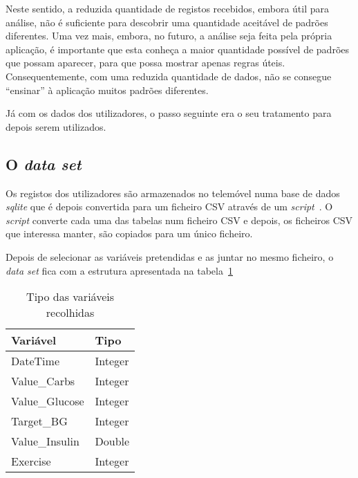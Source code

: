 Neste sentido, a reduzida quantidade de registos recebidos, embora útil para análise, não é suficiente para descobrir uma quantidade aceitável de padrões diferentes. Uma vez mais, embora, no futuro, a análise seja feita pela própria aplicação, é importante que esta conheça a maior quantidade possível de padrões que possam aparecer, para que possa mostrar apenas regras úteis. Consequentemente, com uma reduzida quantidade de dados, não se consegue ``ensinar'' à aplicação muitos padrões diferentes.


Já com os dados dos utilizadores, o passo seguinte era o seu tratamento para depois serem utilizados.


\subsection{O \textit{data set}}

Os registos dos utilizadores são armazenados no telemóvel numa base de dados \textit{sqlite} que é depois convertida para um ficheiro \ac{CSV} através de um \textit{script}~\cite{script}. O \textit{script} converte cada uma das tabelas num ficheiro \ac{CSV} e depois, os ficheiros \ac{CSV} que interessa manter, são copiados para um único ficheiro.

Depois de selecionar as variáveis pretendidas e as juntar no mesmo ficheiro, o \textit{data set} fica com a estrutura apresentada na tabela~\ref{tab:tipos}
 

\begin{table}[H]
\centering
\begin{tabular}{|l|l|}
\hline
\rowcolor[HTML]{C0C0C0} 
{\color[HTML]{000000} \textbf{Variável}} & {\color[HTML]{000000} \textbf{Tipo}} \\ \hline
\rowcolor[HTML]{FFFFFF} 
DateTime                                 & Integer                              \\ \hline
\rowcolor[HTML]{FFFFFF} 
Value\_Carbs                             & Integer                              \\ \hline
\rowcolor[HTML]{FFFFFF} 
Value\_Glucose                           & Integer                              \\ \hline
\rowcolor[HTML]{FFFFFF} 
Target\_BG                               & Integer                              \\ \hline
\rowcolor[HTML]{FFFFFF} 
Value\_Insulin                           & Double                               \\ \hline
Exercise                                 & Integer                              \\ \hline
\end{tabular}

\caption{Tipo das variáveis recolhidas}
\label{tab:tipos}
\end{table}

